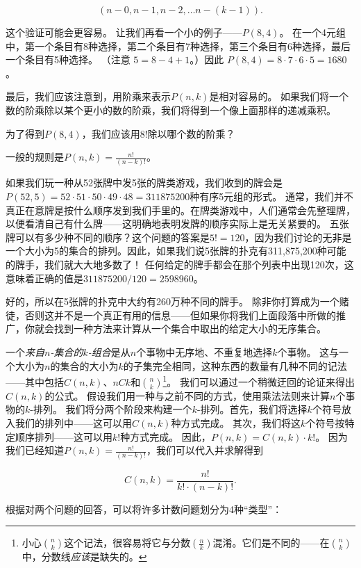 \[ (n-0, n-1, n-2, \ldots n-(k-1) ). \]

这个验证可能会更容易。
让我们再看一个小的例子——$P(8,4)$。
在一个4元组中，第一个条目有8种选择，第二个条目有7种选择，第三个条目有6种选择，最后一个条目有5种选择。
（注意 $5 = 8-4+1$。）因此 $P(8,4)=8\cdot 7 \cdot 6 \cdot 5 = 1680$。

最后，我们应该注意到，用阶乘来表示$P(n,k)$是相对容易的。
如果我们将一个数的阶乘除以某个更小的数的阶乘，我们将得到一个像上面那样的递减乘积。

\begin{exer}
为了得到$P(8,4)$，我们应该用$8!$除以哪个数的阶乘？
\end{exer}

一般的规则是$P(n,k) = \frac{n!}{(n-k)!}$。

如果我们玩一种从52张牌中发5张的牌类游戏，我们收到的牌会是$P(52,5) = 52 \cdot 51 \cdot 50 \cdot 49 \cdot 48 = 311875200$种有序5元组的形式。
通常，我们并不真正在意牌是按什么顺序发到我们手里的。在牌类游戏中，人们通常会先整理牌，以便看清自己有什么牌——这明确地表明发牌的顺序实际上是无关紧要的。
五张牌可以有多少种不同的顺序？这个问题的答案是$5! = 120$，因为我们讨论的无非是一个大小为5的集合的排列。因此，如果我们说5张牌的扑克有311,875,200种可能的牌手，我们就大大地多数了！
任何给定的牌手都会在那个列表中出现120次，这意味着正确的值是$311875200/120 = 2598960$。

好的，所以在5张牌的扑克中大约有260万种不同的牌手。
除非你打算成为一个赌徒，否则这并不是一个真正有用的信息——但如果你将我们上面段落中所做的推广，你就会找到一种方法来计算从一个集合中取出的给定大小的无序集合。

一个\emph{来自$n$-集合的$k$-组合}是从$n$个事物中无序地、不重复地选择$k$个事物。
这与一个大小为$n$的集合的大小为$k$的子集完全相同，这种东西的数量有几种不同的记法——其中包括$C(n,k)$、$nCk$和$\displaystyle\binom{n}{k}$\footnote{小心$\binom{n}{k}$这个记法，很容易将它与分数$\left(\frac{n}{k}\right)$混淆。它们是不同的——在$\binom{n}{k}$中，分数线\emph{应该}是缺失的。}。
我们可以通过一个稍微迂回的论证来得出$C(n,k)$的公式。
假设我们用一种与之前不同的方式，使用乘法法则来计算$n$个事物的$k$-排列。
我们将分两个阶段来构建一个$k$-排列。首先，我们将选择$k$个符号放入我们的排列中——这可以用$C(n,k)$种方式完成。
其次，我们将这$k$个符号按特定顺序排列——这可以用$k!$种方式完成。
因此，$P(n,k) = C(n,k) \cdot k!$。
因为我们已经知道$P(n,k) = \frac{n!}{(n-k)!}$，我们可以代入并求解得到

\[ C(n,k) = \frac{n!}{k! \cdot (n-k)!}. \]

根据对两个问题的回答，可以将许多计数问题划分为4种“类型”：

